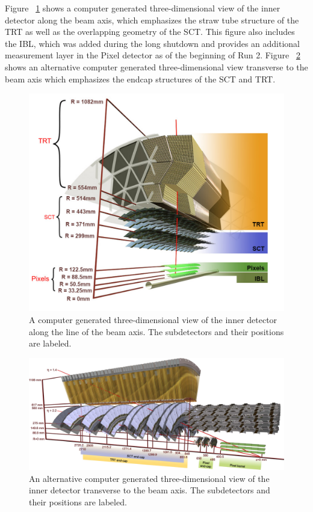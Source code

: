 Figure ~\ref{fig:id_slice} shows a computer generated three-dimensional view of the inner detector along the beam axis, which emphasizes the straw tube structure of the \ac{TRT} as well as the overlapping geometry of the \ac{SCT}.
This figure also includes the \ac{IBL}, which was added during the long shutdown and provides an additional measurement layer in the Pixel detector as of the beginning of Run 2. 
Figure ~\ref{fig:id_slice_long} shows an alternative computer generated three-dimensional view transverse to the beam axis which emphasizes the endcap structures of the \ac{SCT} and \ac{TRT}. 

\begin{figure}[hbtp]
\includegraphics[width=\fullfig]{figures/id_slice.png}
\caption{A computer generated three-dimensional view of the inner detector along the line of the beam axis. The subdetectors and their positions are labeled.}
\label{fig:id_slice}
\end{figure}


\begin{figure}[hbtp]
\includegraphics[width=\fullfig]{figures/id_slice_long.pdf}
\caption{An alternative computer generated three-dimensional view of the inner detector transverse to the beam axis. The subdetectors and their positions are labeled.}
\label{fig:id_slice_long}
\end{figure}

